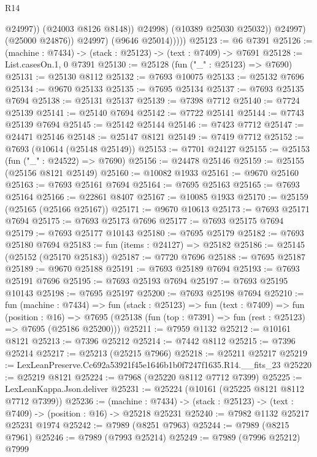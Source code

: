 \begin{lexlean}{R14}
\begin{coremodule}
                            @24997))
                        (@24003 @8126 @8148))
                      @24998)
                    (@10389 @25030 @25032))
                  @24997)
                (@25000 @24876))
              @24997)
            (@9646 @25014)))))
@25123 := @6 @7391
@25126 := (machine : @7434) -> (stack : @25123) -> (text : @7409) -> @7691
@25128 := List.casesOn.{1, 0} @7391
@25130 := @25128 (fun ("_" : @25123) => @7690)
@25131 := @25130 @8112
@25132 := @7693 @10075
@25133 := @25132 @7696
@25134 := @9670 @25133
@25135 := @7695 @25134
@25137 := @7693 @25135 @7694
@25138 := @25131 @25137
@25139 := @7398 @7712
@25140 := @7724 @25139
@25141 := @25140 @7694
@25142 := @7722 @25141
@25144 := @7743 @25139 @7694
@25145 := @25142 @25144
@25146 := @7423 @7712
@25147 := @24471 @25146
@25148 := @25147 @8121
@25149 := @7419 @7712
@25152 := @7693 (@10614 (@25148 @25149))
@25153 := @7701 @24127
@25155 := @25153 (fun ("_" : @24522) => @7690)
@25156 := @24478 @25146
@25159 := @25155 (@25156 @8121 @25149)
@25160 := @10082 @1933
@25161 := @9670 @25160
@25163 := @7693 @25161 @7694
@25164 := @7695 @25163
@25165 := @7693 @25164
@25166 := @22861 @8407
@25167 := @10085 @1933
@25170 := @25159 (@25165 (@25166 @25167))
@25171 := @9670 @10613
@25173 := @7693 @25171 @7694
@25175 := @7693 @25173 @7696
@25177 := @7693 @25175 @7694
@25179 := @7693 @25177 @10143
@25180 := @7695 @25179
@25182 := @7693 @25180 @7694
@25183 := fun (items : @24127) => @25182
@25186 := @25145 (@25152 (@25170 @25183))
@25187 := @7720 @7696
@25188 := @7695 @25187
@25189 := @9670 @25188
@25191 := @7693 @25189 @7694
@25193 := @7693 @25191 @7696
@25195 := @7693 @25193 @7694
@25197 := @7693 @25195 @10143
@25198 := @7695 @25197
@25200 := @7693 @25198 @7694
@25210 := fun (machine : @7434) =>
  fun (stack : @25123) =>
  fun (text : @7409) =>
  fun (position : @16) =>
  @7695 (@25138 (fun (top : @7391) => fun (rest : @25123) => @7695 (@25186 @25200)))
@25211 := @7959 @1132
@25212 := @10161 @8121
@25213 := @7396 @25212
@25214 := @7442 @8112
@25215 := @7396 @25214
@25217 := @25213 (@25215 @7966)
@25218 := @25211 @25217
@25219 := LexLeanPreserve.Cc692a53921f45e1646b1b0f7247f1635.R14.__fits_23
@25220 := @25219 @8121
@25224 := @7968 (@25220 @8112 @7712 @7399)
@25225 := LexLeanKappa.Json.deliver
@25231 := @25224 (@10161 (@25225 @8121 @8112 @7712 @7399))
@25236 := (machine : @7434) ->
  (stack : @25123) -> (text : @7409) -> (position : @16) -> @25218 @25231
@25240 := @7982 @1132 @25217 @25231 @1974
@25242 := @7989 (@8251 @7963)
@25244 := @7989 (@8215 @7961)
@25246 := @7989 (@7993 @25214)
@25249 := @7989 (@7996 @25212) @7999

\end{coremodule}
\end{lexlean}
